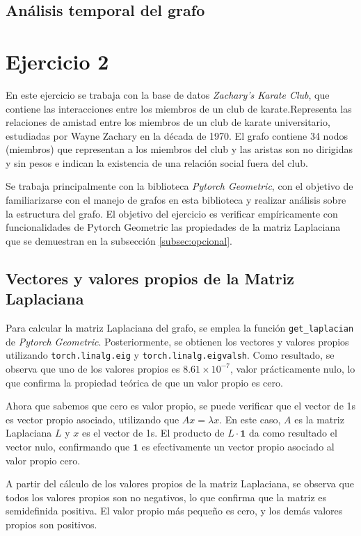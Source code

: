 \documentclass{article}
\begin{document}
\subsection{Análisis temporal del grafo}

\section{Ejercicio 2} \label{sec: ej2}
En este ejercicio se trabaja con la base de datos \textit{Zachary's Karate Club}, que contiene las interacciones entre los miembros de un club de karate.Representa las relaciones de amistad entre los miembros de un club de karate universitario, estudiadas por Wayne Zachary en la década de 1970. El grafo contiene 34 nodos (miembros) que representan a los miembros del club y las aristas son no dirigidas y sin pesos e indican la existencia de una relación social fuera del club.

Se trabaja principalmente con la biblioteca \textit{Pytorch Geometric}, con el objetivo de familiarizarse con el manejo de grafos en esta biblioteca y realizar análisis sobre la estructura del grafo. El objetivo del ejercicio es verificar empíricamente con funcionalidades de Pytorch Geometric las propiedades de la matriz Laplaciana que se demuestran en la subsección \ref{subsec:opcional}.

\subsection{Vectores y valores propios de la Matriz Laplaciana}
Para calcular la matriz Laplaciana del grafo, se emplea la función \verb|get_laplacian| de \textit{Pytorch Geometric}. Posteriormente, se obtienen los vectores y valores propios utilizando \verb|torch.linalg.eig| y \verb|torch.linalg.eigvalsh|. Como resultado, se observa que uno de los valores propios es $8.61 \times 10^{-7}$, valor prácticamente nulo, lo que confirma la propiedad teórica de que un valor propio es cero.

Ahora que sabemos que cero es valor propio, se puede verificar que el vector de 1s es vector propio asociado, utilizando que $Ax = \lambda x$. En este caso, $A$ es la matriz Laplaciana $L$ y $x$ es el vector de 1s. El producto de $L \cdot \mathbf{1}$ da como resultado el vector nulo, confirmando que $\mathbf{1}$ es efectivamente un vector propio asociado al valor propio cero.

A partir del cálculo de los valores propios de la matriz Laplaciana, se observa que todos los valores propios son no negativos, lo que confirma que la matriz es semidefinida positiva. El valor propio más pequeño es cero, y los demás valores propios son positivos.
\end{document}
